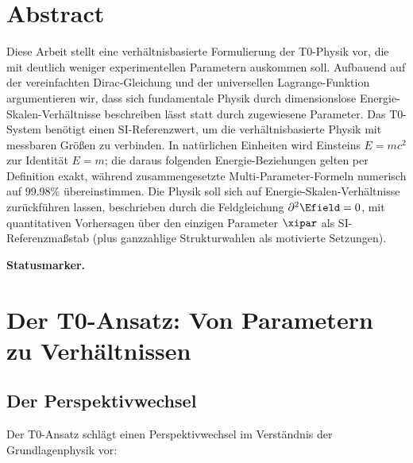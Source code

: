 \section*{Abstract}
		Diese Arbeit stellt eine verhältnisbasierte Formulierung der T0-Physik vor, die mit deutlich weniger experimentellen Parametern auskommen soll. Aufbauend auf der vereinfachten Dirac-Gleichung und der universellen Lagrange-Funktion argumentieren wir, dass sich fundamentale Physik durch dimensionslose Energie-Skalen-Verhältnisse beschreiben lässt statt durch zugewiesene Parameter. Das T0-System benötigt einen SI-Referenzwert, um die verhältnisbasierte Physik mit messbaren Größen zu verbinden. In natürlichen Einheiten wird Einsteins $E = mc^2$ zur Identität $E = m$; die daraus folgenden Energie-Beziehungen gelten per Definition exakt, während zusammengesetzte Multi-Parameter-Formeln numerisch auf 99.98\% übereinstimmen. Die Physik soll sich auf Energie-Skalen-Verhältnisse zurückführen lassen, beschrieben durch die Feldgleichung $\partial^2 \Efield = 0$, mit quantitativen Vorhersagen über den einzigen Parameter $\xipar$ als SI-Referenzmaßstab (plus ganzzahlige Strukturwahlen als motivierte Setzungen).

	\medskip\noindent\textbf{Statusmarker.}
	

	
	
	\section{Der T0-Ansatz: Von Parametern zu Verhältnissen}
	
	\subsection{Der Perspektivwechsel}
	
	Der T0-Ansatz schlägt einen Perspektivwechsel im Verständnis der Grundlagenphysik vor:
	
